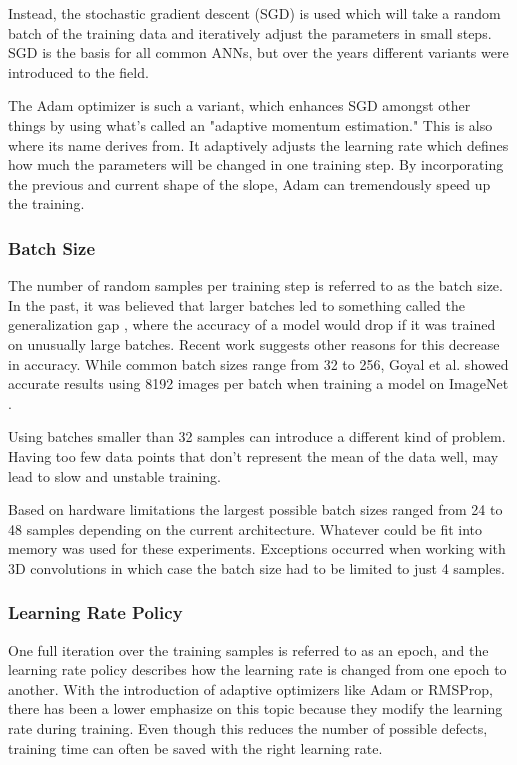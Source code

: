 Instead, the stochastic gradient descent (SGD) is used which will take a random batch of the training data and iteratively adjust the parameters in small steps. SGD is the basis for all common ANNs, but over the years different variants were introduced to the field.

The Adam optimizer \cite{Kingma2014} is such a variant, which enhances SGD amongst other things by using what's called an "adaptive momentum estimation." This is also where its name derives from. It adaptively adjusts the learning rate which defines how much the parameters will be changed in one training step. By incorporating the previous and current shape of the slope, Adam can tremendously speed up the training.

\subsubsection{Batch Size}

The number of random samples per training step is referred to as the batch size. In the past, it was believed that larger batches led to something called the generalization gap \cite{Keskar2016}, where the accuracy of a model would drop if it was trained on unusually large batches. Recent work \cite{Hoffer2017} suggests other reasons for this decrease in accuracy. While common batch sizes range from 32 to 256, Goyal et al. showed accurate results using 8192 images per batch when training a model on ImageNet \cite{Goyal2017}.

Using batches smaller than 32 samples can introduce a different kind of problem. Having too few data points that don't represent the mean of the data well, may lead to slow and unstable training.

Based on hardware limitations the largest possible batch sizes ranged from 24 to 48 samples depending on the current architecture. Whatever could be fit into memory was used for these experiments. Exceptions occurred when working with 3D convolutions in which case the batch size had to be limited to just 4 samples.

\subsubsection{Learning Rate Policy}

One full iteration over the training samples is referred to as an epoch, and the learning rate policy describes how the learning rate is changed from one epoch to another. With the introduction of adaptive optimizers like Adam or RMSProp, there has been a lower emphasize on this topic because they modify the learning rate during training. Even though this reduces the number of possible defects, training time can often be saved with the right learning rate.

